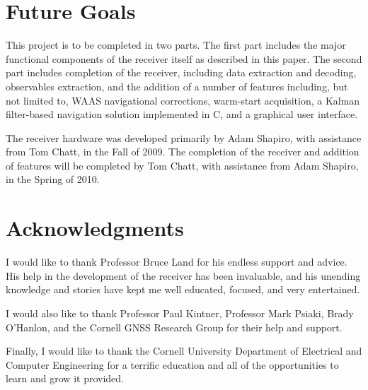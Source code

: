 \documentclass[12pt]{article}
\begin{document}
\section{Future Goals}
This project is to be completed in two parts. The first part includes the major functional components of the receiver itself as described in this paper. The second part includes completion of the receiver, including data extraction and decoding, observables extraction, and the addition of a number of features including, but not limited to, WAAS navigational corrections, warm-start acquisition, a Kalman filter-based navigation solution implemented in C, and a graphical user interface.

The receiver hardware was developed primarily by Adam Shapiro, with assistance from Tom Chatt, in the Fall of 2009. The completion of the receiver and addition of features will be completed by Tom Chatt, with assistance from Adam Shapiro, in the Spring of 2010.

\section{Acknowledgments}
I would like to thank Professor Bruce Land for his endless support and advice. His help in the development of the receiver has been invaluable, and his unending knowledge and stories have kept me well educated, focused, and very entertained.

I would also like to thank Professor Paul Kintner, Professor Mark Psiaki, Brady O'Hanlon, and the Cornell GNSS Research Group for their help and support.

Finally, I would like to thank the Cornell University Department of Electrical and Computer Engineering for a terrific education and all of the opportunities to learn and grow it provided.



\nocite{misre}
\nocite{wakerly}
\end{document}
